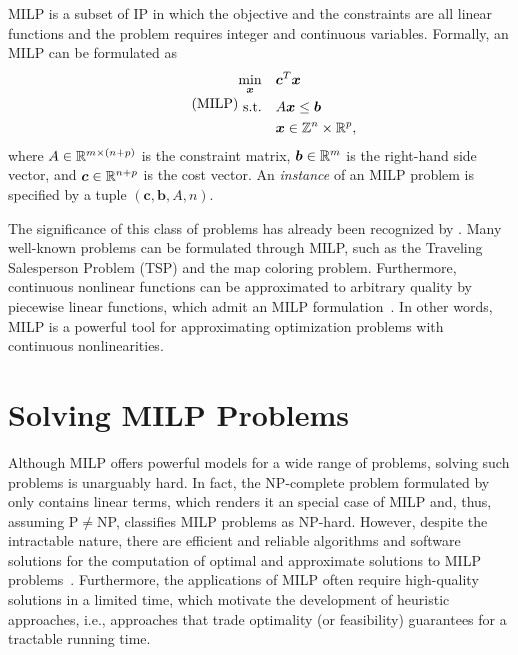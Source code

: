 MILP is a subset of IP in which the objective and the constraints are all linear functions and the problem requires integer and continuous variables.
Formally, an MILP can be formulated as 
\begin{equation}\label{eq:general-milp}\tag{MILP}
\begin{split}
    \min_{\bm{x}} \quad & \bm{c}^{T}\bm{x} \\
    \textrm{s.t.} \quad & A\bm{x} \le \bm{b} \\
	  & \bm{x} \in \mathbb{Z}^{n}\times \mathbb{R}^{p}
,\end{split}
\end{equation}
where $A\in \mathbb{R}^{m\times (n+p)}$ is the constraint matrix, $\bm{b}\in \mathbb{R}^{m}$ is the right-hand side vector, and $\bm{c}\in \mathbb{R}^{n+p}$ is the cost vector.
An \emph{instance} of an MILP problem is specified by a tuple  $\left( \bm{c},\bm{b},A,n \right)$.

The significance of this class of problems has already been recognized by .
Many well-known problems can be formulated through MILP, such as the Traveling Salesperson Problem (TSP) and the map coloring problem.
Furthermore, continuous nonlinear functions can be approximated to arbitrary quality by piecewise linear functions, which admit an MILP formulation~\cite{camponogaraModelsAlgorithmsOptimal2015}.
In other words, MILP is a powerful tool for approximating optimization problems with continuous nonlinearities.

\section{Solving MILP Problems}

Although MILP offers powerful models for a wide range of problems, solving such problems is unarguably hard.
In fact, the NP-complete problem formulated by  only contains linear terms, which renders it an special case of MILP and, thus, assuming P$\neq$NP, classifies MILP problems as NP-hard.
However, despite the intractable nature, there are efficient and reliable algorithms and software solutions for the computation of optimal and approximate solutions to MILP problems~\cite{bengioMachineLearningCombinatorial2021}.
Furthermore, the applications of MILP often require high-quality solutions in a limited time, which motivate the development of heuristic approaches, i.e., approaches that trade optimality (or feasibility) guarantees for a tractable running time.


